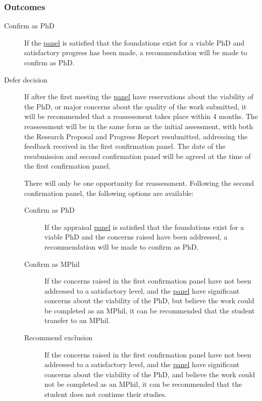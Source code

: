 \documentclass[12pt,a4paper]{article}
\begin{document}
\subsubsection{Outcomes}

\begin{description}
	\item[Confirm as PhD] If the \hyperref[sec:panel]{panel} is satisfied that the foundations exist for a viable PhD and satisfactory progress has been made, a recommendation will be made to confirm as PhD.
	\item[Defer decision] If after the first meeting the \hyperref[sec:panel]{panel} have reservations about the viability of the PhD, or major concerns about the quality of the work submitted, it will be recommended that a reassessment takes place within 4 months. The reassessment will be in the same form as the initial assessment, with both the Research Proposal and Progress Report resubmitted, addressing the feedback received in the first confirmation panel. The date of the resubmission and second confirmation panel will be agreed at the time of the first confirmation panel.
	
	There will only be one opportunity for reassessment. Following the second confirmation panel, the following options are available:
	\begin{description}
		\item[Confirm as PhD] If the appraisal \hyperref[sec:panel]{panel} is satisfied that the foundations exist for a viable PhD and the concerns raised have been addressed, a recommendation will be made to confirm as PhD.
		\item[Confirm as MPhil] If the concerns raised in the first confirmation panel have not been addressed to a satisfactory level, and the \hyperref[sec:panel]{panel} have significant concerns about the viability of the PhD, but believe the work could be completed as an MPhil, it can be recommended that the student transfer to an MPhil.
		\item[Recommend exclusion] If the concerns raised in the first confirmation panel have not been addressed to a satisfactory level, and the \hyperref[sec:panel]{panel} have significant concerns about the viability of the PhD, and believe the work could not be completed as an MPhil, it can be recommended that the student does not continue their studies.
	\end{description}
\end{description}
\end{document}
